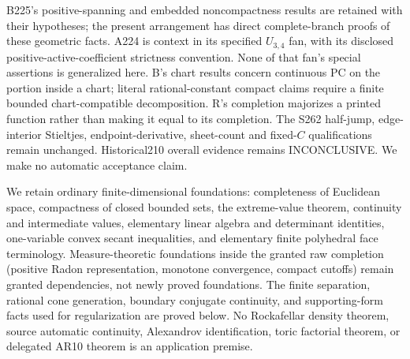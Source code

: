 \documentclass[11pt]{article}
\begin{document}
B225's positive-spanning and embedded noncompactness results are retained with their hypotheses; the present arrangement has direct complete-branch proofs of these geometric facts. A224 is context in its specified $U_{3,4}$ fan, with its disclosed positive-active-coefficient strictness convention. None of that fan's special assertions is generalized here. B's chart results concern continuous PC on the portion inside a chart; literal rational-constant compact claims require a finite bounded chart-compatible decomposition. R's completion majorizes a printed function rather than making it equal to its completion. The S262 half-jump, edge-interior Stieltjes, endpoint-derivative, sheet-count and fixed-$C$ qualifications remain unchanged. Historical210 overall evidence remains INCONCLUSIVE. We make no automatic acceptance claim.

We retain ordinary finite-dimensional foundations: completeness of Euclidean space, compactness of closed bounded sets, the extreme-value theorem, continuity and intermediate values, elementary linear algebra and determinant identities, one-variable convex secant inequalities, and elementary finite polyhedral face terminology. Measure-theoretic foundations inside the granted raw completion (positive Radon representation, monotone convergence, compact cutoffs) remain granted dependencies, not newly proved foundations. The finite separation, rational cone generation, boundary conjugate continuity, and supporting-form facts used for regularization are proved below. No Rockafellar density theorem, source automatic continuity, Alexandrov identification, toric factorial theorem, or delegated AR10 theorem is an application premise.
\end{document}
